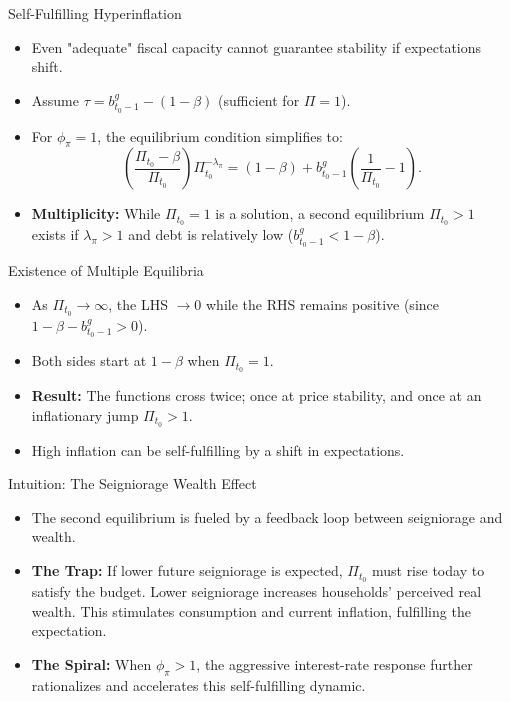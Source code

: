 \documentclass[11pt,aspectratio=169]{beamer}
\begin{document}
\begin{frame}{Self-Fulfilling Hyperinflation}
\small


\begin{itemize}
    \item Even "adequate" fiscal capacity cannot guarantee stability if expectations shift.
    \item Assume $\tau = b_{t_{0}-1}^{g}-(1-\beta)$ (sufficient for $\Pi=1$).
    \item For $\phi_{\pi} = 1$, the equilibrium condition simplifies to:
    \begin{equation*}
    \left( \frac{\Pi _{t_{0}}-\beta }{\Pi _{t_{0}}}\right) \Pi _{t_{0}}^{-\lambda _{\pi }} = (1-\beta ) + b_{t_{0}-1}^{g}\left( \frac{1}{\Pi _{t_{0}}} - 1 \right).
    \end{equation*}
    \item \textbf{Multiplicity:} While $\Pi_{t_0}=1$ is a solution, a second equilibrium $\Pi_{t_0}>1$ exists if $\lambda_{\pi} > 1$ and debt is relatively low ($b_{t_{0}-1}^{g} < 1-\beta$).
\end{itemize}
\end{frame}

\begin{frame}{Existence of Multiple Equilibria}
\small
\begin{itemize}
    \item As $\Pi_{t_0} \to \infty$, the LHS $\to 0$ while the RHS remains positive (since $1-\beta - b_{t_{0}-1}^{g} > 0$).
    \item  Both sides start at $1-\beta$ when $\Pi_{t_0}=1$. 
    \item \textbf{Result:} The functions cross twice; once at price stability, and once at an inflationary jump $\Pi_{t_0}>1$.
    \item High inflation can be self-fulfilling by a shift in expectations.
\end{itemize}
\end{frame}



\begin{frame}{Intuition: The Seigniorage Wealth Effect}
\small


\begin{itemize}
\item The second equilibrium is fueled by a feedback loop between seigniorage and wealth.
    \item \textbf{The Trap:} If lower future seigniorage is expected, $\Pi_{t_0}$ must rise today to satisfy the budget. Lower seigniorage increases households' perceived real wealth. This stimulates consumption and current inflation, fulfilling the expectation.
    \item \textbf{The Spiral:} When $\phi_{\pi} > 1$, the aggressive interest-rate response further rationalizes and accelerates this self-fulfilling dynamic.
\end{itemize}
\end{frame}
\end{document}
